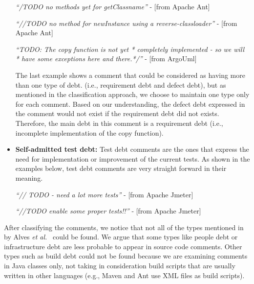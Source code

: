 \begin{itemize}
  \begin{displayquote}
    \textit{``/TODO no methods yet for getClassname''} - [from Apache Ant]
    
    \vspace{1mm}
    
    \textit{``//TODO no method for newInstance using a reverse-classloader''} - [from Apache Ant]

    \vspace{1mm}
    
    \textit{``TODO: The copy function is not yet * completely implemented - so we will  * have some exceptions here and there.*/''} - [from ArgoUml]  
    
  \end{displayquote}
  \vspace{1mm}  
  
The last example shows a comment that could be considered as having more than one type of debt. (i.e., requirement debt and defect debt), but as mentioned in the classification approach, we choose to maintain one type only for each comment. Based on our understanding, the defect debt expressed in the comment would not exist if the requirement debt did not exists. Therefore, the main debt in this comment is a requirement debt (i.e., incomplete implementation of the copy function). 
      
  \vspace{1mm}
  \item \textbf{Self-admitted test debt:} Test debt comments are the ones that express the need for implementation or improvement of the current tests. As shown in the examples below, test debt comments are very straight forward in their meaning. 
  
  \begin{displayquote}
    \textit{``// TODO - need a lot more tests''} - [from Apache Jmeter]
    
    \vspace{1mm}
    
    \textit{``//TODO enable some proper tests!!''} - [from Apache Jmeter]
  \end{displayquote}
  \vspace{1mm}  
    
\end{itemize}

After classifying the comments, we notice that not all of the types mentioned in by Alves \emph{et al.}~\cite{Alves2014MTD} could be found. We argue that some types like people debt or infrastructure debt are less probable to appear in source code comments. Other types such as build debt could not be found because we are examining comments in Java classes only, not taking in consideration build scripts that are usually written in other languages (e.g., Maven and Ant use XML files as build scripts). 

